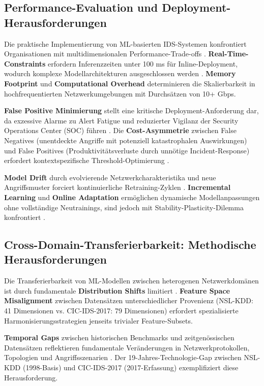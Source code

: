 \documentclass[11pt,a4paper]{article}
\begin{document}
    \subsection{Performance-Evaluation und Deployment-Herausforderungen}

    Die praktische Implementierung von ML-basierten IDS-Systemen konfrontiert Organisationen mit multidimensionalen Performance-Trade-offs \parencite{Gharib2016}. \textbf{Real-Time-Constraints} erfordern Inferenzzeiten unter 100 ms für Inline-Deployment, wodurch komplexe Modellarchitekturen ausgeschlossen werden \parencite{Belavagi2016}. \textbf{Memory Footprint} und \textbf{Computational Overhead} determinieren die Skalierbarkeit in hochfrequentierten Netzwerkumgebungen mit Durchsätzen von 10+ Gbps.

    \textbf{False Positive Minimierung} stellt eine kritische Deployment-Anforderung dar, da exzessive Alarme zu Alert Fatigue und reduzierter Vigilanz der Security Operations Center (SOC) führen \parencite{Ring2019}. Die \textbf{Cost-Asymmetrie} zwischen False Negatives (unentdeckte Angriffe mit potenziell katastrophalen Auswirkungen) und False Positives (Produktivitätsverluste durch unnötige Incident-Response) erfordert kontextspezifische Threshold-Optimierung \parencite{Hastie2009}.

    \textbf{Model Drift} durch evolvierende Netzwerkcharakteristika und neue Angriffsmuster forciert kontinuierliche Retraining-Zyklen \parencite{Ring2019}. \textbf{Incremental Learning} und \textbf{Online Adaptation} ermöglichen dynamische Modellanpassungen ohne vollständige Neutrainings, sind jedoch mit Stability-Plasticity-Dilemma konfrontiert \parencite{Goodfellow2016}.

    \subsection{Cross-Domain-Transferierbarkeit: Methodische Herausforderungen}

    Die Transferierbarkeit von ML-Modellen zwischen heterogenen Netzwerkdomänen ist durch fundamentale \textbf{Distribution Shifts} limitiert \parencite{Bishop2006}. \textbf{Feature Space Misalignment} zwischen Datensätzen unterschiedlicher Provenienz (NSL-KDD: 41 Dimensionen vs. CIC-IDS-2017: 79 Dimensionen) erfordert spezialisierte Harmonisierungsstrategien jenseits trivialer Feature-Subsets.

    \textbf{Temporal Gaps} zwischen historischen Benchmarks und zeitgenössischen Datensätzen reflektieren fundamentale Veränderungen in Netzwerkprotokollen, Topologien und Angriffsszenarien \parencite{McHugh2000,Sharafaldin2018}. Der 19-Jahres-Technologie-Gap zwischen NSL-KDD (1998-Basis) und CIC-IDS-2017 (2017-Erfassung) exemplifiziert diese Herausforderung.
\end{document}
